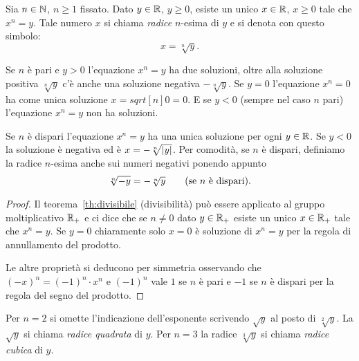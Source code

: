 \begin{theorem}
  \label{radice!$n$-esima}%
Sia $n\in {\mathbb N}$, $n\ge 1$ fissato.
Dato $y\in {\mathbb R}$, $y \ge 0$, esiste un unico $x\in {\mathbb R}$, $x\ge 0$ tale che $x^n = y$.
Tale numero $x$ si chiama \emph{radice} $n$-esima di $y$ e si 
denota con questo simbolo:
\[
  x = \sqrt[n]{y}.
\]

Se $n$ è pari e $y>0$ l'equazione $x^n=y$ ha due soluzioni, oltre alla soluzione positiva 
$\sqrt[n]{y}$ c'è anche una soluzione negativa $-\sqrt[n]{y}$.
Se $y=0$ l'equazione $x^n=0$ ha come unica soluzione $x=sqrt[n]{0}=0$.
E se $y<0$ (sempre nel caso $n$ pari) l'equazione $x^n = y$ non ha soluzioni.

Se $n$ è dispari l'equazione $x^n=y$ ha una unica soluzione per ogni $y\in {\mathbb R}$.
Se $y<0$ la soluzione è negativa ed è $x=-\sqrt[n]{{\left|y\right|}}$.
Per comodità, se $n$ è dispari, definiamo la radice $n$-esima anche sui numeri negativi 
ponendo appunto 
\[
  \sqrt[n]{-y} =  -\sqrt[n]{y}\qquad\text{(se $n$ è dispari).}
\]
\end{theorem}
\begin{proof}
Il teorema~\ref{th:divisibile} (divisibilità) può essere applicato al gruppo moltiplicativo 
${\mathbb R}_+$ e ci dice che se $n\neq 0$ dato $y\in {\mathbb R}_+$ esiste un unico $x\in {\mathbb R}_+$ tale 
che $x^n = y$. Se $y=0$ chiaramente solo $x=0$ è soluzione di $x^n= y$ per la regola 
di annullamento del prodotto. 

Le altre proprietà si deducono per simmetria osservando che $(-x)^n = (-1)^n\cdot x^n$
e $(-1)^n$ vale $1$ se $n$ è pari e $-1$ se $n$ è dispari per la regola del segno 
del prodotto.
\end{proof}

%
%
Per $n=2$ si omette l'indicazione dell'esponente scrivendo $\sqrt y$ al posto di $\sqrt[2] y$.
La $\sqrt y$ si chiama \emph{radice quadrata} di $y$.
Per $n=3$ la radice $\sqrt[3]{y}$ si chiama \emph{radice cubica} di $y$.

